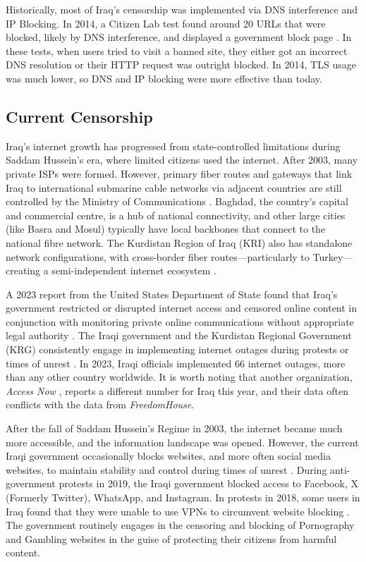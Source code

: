 Historically, most of Iraq's censorship was implemented via DNS interference and IP Blocking. In 2014, a Citizen Lab test found around 20 URLs that were blocked, likely by DNS interference, and displayed a government block page \cite{citizenlabIraqPastCensorship}. In these tests, when users tried to visit a banned site, they either got an incorrect DNS resolution or their HTTP request was outright blocked. In 2014, TLS usage was much lower, so DNS and IP blocking were more effective than today. 

\subsection{Current Censorship}

Iraq's internet growth has progressed from state-controlled limitations during Saddam Hussein's era, where limited citizens used the internet. After 2003, many private ISPs were formed. However, primary fiber routes and gateways that link Iraq to international submarine cable networks via adjacent countries are still controlled by the Ministry of Communications \cite{IraqCMC}. Baghdad, the country's capital and commercial centre, is a hub of national connectivity, and other large cities (like Basra and Mosul) typically have local backbones that connect to the national fibre network. The Kurdistan Region of Iraq (KRI) also has standalone network configurations, with cross-border fiber routes—particularly to Turkey—creating a semi-independent internet ecosystem \cite{freedomhouseIraqFreedom}. 

A 2023 report from the United States Department of State found that Iraq's government restricted or disrupted internet access and censored online content in conjunction with monitoring private online communications without appropriate legal authority \cite{USDoSIraq2023}. The Iraqi government and the Kurdistan Regional Government (KRG) consistently engage in implementing internet outages during protests or times of unrest \cite{freedomhouseIraqFreedom}. In 2023, Iraqi officials implemented 66 internet outages, more than any other country worldwide. It is worth noting that another organization, \textit{Access Now} \cite{accessnowBlackoutReport2023}, reports a different number for Iraq this year, and their data often conflicts with the data from \textit{FreedomHouse}.  

After the fall of Saddam Hussein's Regime in 2003, the internet became much more accessible, and the information landscape was opened. However, the current Iraqi government occasionally blocks websites, and more often social media websites, to maintain stability and control during times of unrest \cite{freedomhouseIraqFreedom}. During anti-government protests in 2019, the Iraqi government blocked access to Facebook, X (Formerly Twitter), WhatsApp, and Instagram. In protests in 2018, some users in Iraq found that they were unable to use VPNs to circumvent website blocking \cite{freedomhouseIraqFreedom}. The government routinely engages in the censoring and blocking of Pornography and Gambling websites in the guise of protecting their citizens from harmful content. 

